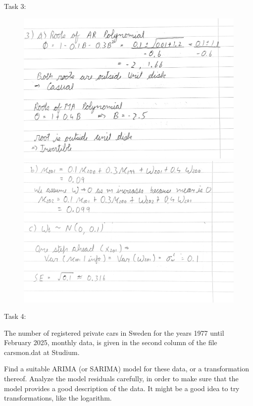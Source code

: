 \documentclass[a4paper,11pt]{article}
\begin{document}
    \newpage
    Task 3:    
    \begin{figure}[H]
        \centering
        \includegraphics[width=1\textwidth]{ha-1_files/3-1.png}
        \includegraphics[width=1\textwidth]{ha-1_files/3-2.png}
        \label{fig:3}
    \end{figure}

    \newpage
    Task 4:

    The number of registered private cars in Sweden for the years 1977 until February 2025, monthly data, is given in the second column of the file carsmon.dat at Studium. 
    
    Find a suitable ARIMA (or SARIMA) model for these data, or a transformation thereof. Analyze the model residuals carefully, in order to make sure that the model provides a good description of the data. It might be a good idea to try transformations, like the logarithm.
\end{document}
